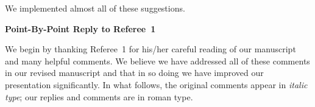 \documentclass[11pt]{article}
\begin{document}
\bigskip
{}

We implemented almost all of these suggestions.



\clearpage
\begin{center}
  {\bf \Large Point-By-Point Reply to Referee~1}
\end{center}

We begin by thanking Referee~1 for his/her careful reading of our
manuscript and many helpful comments. We believe we have addressed all
of these comments in our revised manuscript and that in so doing we
have improved our presentation significantly.  In what follows, the
original comments appear in \emph{italic type}; our replies and
comments are in roman type.

\bigskip
{}
\end{document}

